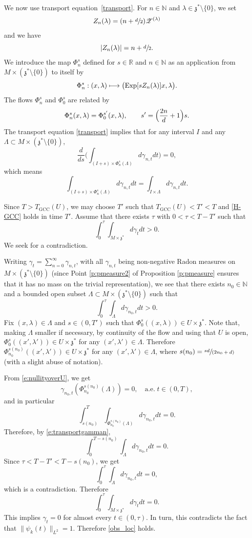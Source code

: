 \documentclass[10pt]{amsart}
\let\mathcal\mathscr
\newcommand\mto{\mathchoice{\longmapsto}{\mapsto}{\mapsto}{\mapsto}}
\newcommand{\spfrac}[2]{\sfrac{#1}{(#2)}}
\newcommand{\GCC}{\mathrm{GCC}}
\DeclareMathOperator{\Exp}{Exp}
\theoremstyle{plain}
\theoremstyle{definition}
\def\R{{\mathbb R}}
\def\N{{\mathbb N}}
\begin{document}
We now use transport equation~\eqref{transport}.
For $n\in\N$ and $\lambda\in\mathfrak z^*\setminus \{0\}$, we set
\[
Z_n(\lambda)= (n+\sfrac d 2) {\mathcal Z}^{(\lambda)}
\]
and we have
\[
| Z_n(\lambda)|= n+\sfrac{d}{2}.
\]
We
introduce the map $\Phi^s_n$ defined for $s\in\R$ and $n\in\N$ as an application from $M\times (\mathfrak z^*\setminus\{0\})$ to itself by
\[
\Phi^s_n: (x,\lambda)\mto \bigl(\Exp[s Z_n(\lambda)]x,\lambda\bigr).
\]
The flows $\Phi_n^s$ and $\Phi_0^s$ are related by
\[
\Phi_n^s(x,\lambda)=\Phi_0^{s'}(x,\lambda), \qquad s'=\Bigl(\frac{2n}{d}+1 \Bigr)s.
\]
The transport equation \eqref{transport} implies that for any interval $I$ and any \hbox{$\Lambda\!\subset\!M\!\!\times\!\!(\mathfrak z^*\!\setminus\!\{0\})$},
\[
\frac d {ds} \biggl(\int _{(I+s)\times \Phi^{s}_n (\Lambda)} d\gamma_{n,t} dt \biggr) =0,
\]
which means
\begin{equation} \label{e:transportgamman}
\int _{(I+s)\times \Phi^{s}_n (\Lambda)} d\gamma_{n,t} dt= \int _{I\times \Lambda} d\gamma_{n,t} dt.
\end{equation}

Since $T>T_\GCC (U)$, we may choose $T'$ such that $T_\GCC (U)<T'<T$ and \eqref{H-GCC} holds in time $T'$. Assume that there exists $\tau$ with $0<\tau<T-T'$ such that
\begin{equation*}%
\int_0^{\tau} \int_{M\times \mathfrak z^*} d\gamma_{t} dt >0.
\end{equation*}
We seek for a contradiction.

Writing $\gamma_t=\sum_{n=0}^\infty \gamma_{n,t}$, with all $\gamma_{n,t}$ being non-negative Radon measures on \hbox{$M\times (\mathfrak z^*\setminus \{0\})$} (since Point \eqref{p:pmeasure2} of Proposition \ref{p:pmeasure} ensures that it has no mass on the trivial representation), we see that there exists $n_0\in\N$ and a bounded open subset $\Lambda\subset M\times (\mathfrak z^*\setminus\{0\})$ such that
\[
\int_0^{\tau} \int_{\Lambda} d\gamma_{n_0,t} dt >0.
\]
Fix $(x,\lambda)\in \Lambda$ and $s\in (0,T')$ such that $\Phi^{s}_0 ((x,\lambda))\in U\times \mathfrak z^*$. Note that, making $\Lambda$ smaller if necessary, by continuity of the flow and using that $U$ is open, $\Phi^{s}_0 ((x',\lambda'))\in U\times \mathfrak z^*$ for any $(x',\lambda')\in\Lambda$. Therefore $\Phi^{s(n_0)}_{n_0} ((x',\lambda'))\in U\times \mathfrak z^*$ for any $(x',\lambda')\in\Lambda$, where $s(n_0)=\spfrac{sd}{2n_0+d}$ (with a slight abuse of notation).

From \eqref{e:nullityoverU}, we get
\[
\gamma_{n_0,t} (\Phi^{s(n_0)}_{n_0} (\Lambda))=0,\quad \text{a.e.}\; t\in(0,T),
\]
and in particular
\[
\int_{s(n_0)}^T \int_{ \Phi^{s(n_0)}_{n_0}(\Lambda)} d\gamma_{n_0,t} dt =0.
\]
Therefore, by \eqref{e:transportgamman},
\[
\int_0^{T-s(n_0)} \int_{\Lambda} d\gamma_{n_0,t} dt =0.
\]
Since $\tau<T-T'<T-s(n_0)$, we get
\[
\int_0^{\tau} \int_{\Lambda} d\gamma_{n_0,t} dt =0,
\]
which is a contradiction.
Therefore
\begin{equation*}
\int_0^{\tau} \int_{M\times \mathfrak z^*} d\gamma_{t} dt =0.
\end{equation*}
This implies $\gamma_t=0$ for almost every $t\in (0,\tau)$. In turn, this contradicts the fact that $\| \psi_k(t)\|_{L^2}=1$. Therefore \eqref{obs_loc} holds.
\end{document}
